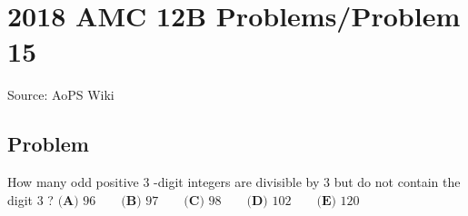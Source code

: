 \documentclass[12pt]{article}
\begin{document}
\section*{{2018 AMC 12B Problems/Problem 15}}
Source: AoPS Wiki

\subsection*{Problem}
How many odd positive $3$ -digit integers are divisible by $3$ but do not contain the digit $3$ ? $\textbf{(A) } 96 \qquad \textbf{(B) } 97 \qquad \textbf{(C) } 98 \qquad \textbf{(D) } 102 \qquad \textbf{(E) } 120$
\end{document}
